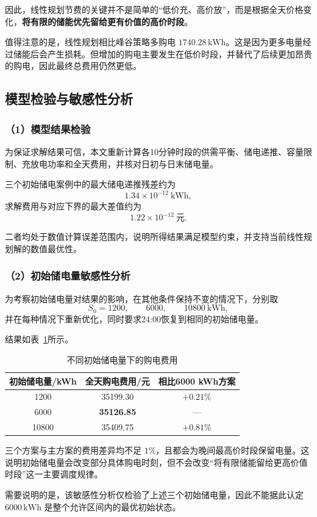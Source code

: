 因此，线性规划节费的关键并不是简单的“低价充、高价放”，而是根据全天价格变化，\textbf{将有限的储能优先留给更有价值的高价时段}。

值得注意的是，线性规划相比峰谷策略多购电 \(1740.28\,\mathrm{kWh}\)。这是因为更多电量经过储能后会产生损耗。但增加的购电主要发生在低价时段，并替代了后续更加昂贵的购电，因此最终总费用仍然更低。

\subsection{模型检验与敏感性分析}

\subsubsection*{（1）模型结果检验}

为保证求解结果可信，本文重新计算各10分钟时段的供需平衡、储电递推、容量限制、充放电功率和全天费用，并核对日初与日末储电量。

三个初始储电案例中的最大储电递推残差约为
\[
1.34\times10^{-12}\ \mathrm{kWh},
\]
求解费用与对应下界的最大差值约为
\[
1.22\times10^{-12}\ \mathrm{元}.
\]

二者均处于数值计算误差范围内，说明所得结果满足模型约束，并支持当前线性规划解的数值最优性。

\subsubsection*{（2）初始储电量敏感性分析}

为考察初始储电量对结果的影响，在其他条件保持不变的情况下，分别取
\[
S_0=1200,\qquad 6000,\qquad 10800\ \mathrm{kWh},
\]
并在每种情况下重新优化，同时要求24:00恢复到相同的初始储电量。

结果如表~\ref{tab:q1_sensitivity}所示。

\begin{table}[H]
    \centering
    \caption{不同初始储电量下的购电费用}
    \label{tab:q1_sensitivity}
    \begin{tabular}{ccc}
        \toprule
        初始储电量/kWh & 全天购电费用/元 & 相比6000 kWh方案 \\
        \midrule
        1200 & 35199.30 & $+0.21\%$ \\
        6000 & \textbf{35126.85} & --- \\
        10800 & 35409.75 & $+0.81\%$ \\
        \bottomrule
    \end{tabular}
\end{table}

三个方案与主方案的费用差异均不足 \(1\%\)，且都会为晚间最高价时段保留电量。这说明初始储电量会改变部分具体购电时刻，但不会改变“将有限储能留给更高价值时段”这一主要调度规律。

需要说明的是，该敏感性分析仅检验了上述三个初始储电量，因此不能据此认定 \(6000\,\mathrm{kWh}\) 是整个允许区间内的最优初始状态。